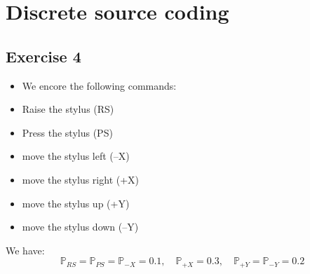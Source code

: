 \documentclass{article}
\newcommand{\1}{\mathbf{1}}
\renewcommand{\P}{\mathbb{P}}
\begin{document}
\section{Discrete source coding}
\subsection{Exercise 4}
\begin{itemize}
  \item We encore the following commands:
  \item Raise the stylus (RS)
  \item Press the stylus (PS)
  \item move the stylus left (–X)
  \item move the stylus right (+X)
  \item move the stylus up (+Y)
  \item move the stylus down (–Y)
\end{itemize}
We have:
$$
\P_{RS} = \P_{PS} = \P_{-X} = 0.1, \quad \P_{+X} = 0.3, \quad \P_{+Y} = \P_{-Y} = 0.2
$$
\end{document}
